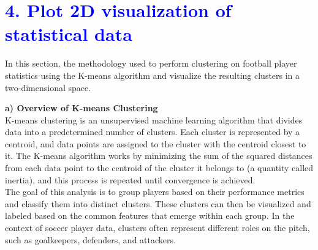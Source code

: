 \documentclass[a4paper,12pt]{article}
\begin{document}
\section*{\textcolor{blue}{\Large 4. Plot 2D visualization of statistical data}}
In this section, the methodology used to perform clustering on football player statistics using the K-means algorithm and visualize the resulting clusters in a two-dimensional space.



\textbf{a) Overview of K-means Clustering} \\
K-means clustering is an unsupervised machine learning algorithm that divides data into a predetermined number of clusters. Each cluster is represented by a centroid, and data points are assigned to the cluster with the centroid closest to it. The K-means algorithm works by minimizing the sum of the squared distances from each data point to the centroid of the cluster it belongs to (a quantity called inertia), and this process is repeated until convergence is achieved. \\
The goal of this analysis is to group players based on their performance metrics and classify them into distinct clusters. These clusters can then be visualized and labeled based on the common features that emerge within each group. In the context of soccer player data, clusters often represent different roles on the pitch, such as goalkeepers, defenders, and attackers.
\end{document}
